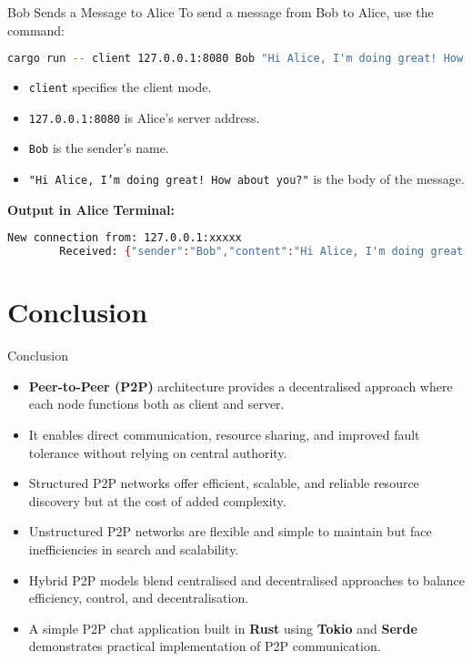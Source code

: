 \documentclass[aspectratio=169, table]{beamer}
\begin{document}
\begin{frame}[fragile]{Bob Sends a Message to Alice}
	\vspace{10pt}
	To send a message from Bob to Alice, use the command:
	\begin{lstlisting}[language=bash]
		cargo run -- client 127.0.0.1:8080 Bob "Hi Alice, I'm doing great! How about you?"
	\end{lstlisting}
	
	\begin{itemize}
		\item \texttt{client} specifies the client mode.
		\item \texttt{127.0.0.1:8080} is Alice's server address.
		\item \texttt{Bob} is the sender's name.
		\item \texttt{"Hi Alice, I'm doing great! How about you?"} is the body of the message.
	\end{itemize}
	
	\textbf{Output in Alice Terminal:}
	\begin{lstlisting}[language=bash]
		New connection from: 127.0.0.1:xxxxx
		Received: {"sender":"Bob","content":"Hi Alice, I'm doing great! How about you?"}
	\end{lstlisting}
\end{frame}

\section{Conclusion}

\begin{frame}{Conclusion}
	\vspace{20pt}
	\begin{itemize}
		\item \textbf{Peer-to-Peer (P2P)} architecture provides a decentralised approach where each node functions both as client and server.
		\item It enables direct communication, resource sharing, and improved fault tolerance without relying on central authority.
		\item Structured P2P networks offer efficient, scalable, and reliable resource discovery but at the cost of added complexity.
		\item Unstructured P2P networks are flexible and simple to maintain but face inefficiencies in search and scalability.
		\item Hybrid P2P models blend centralised and decentralised approaches to balance efficiency, control, and decentralisation.
		\item A simple P2P chat application built in \textbf{Rust} using \textbf{Tokio} and \textbf{Serde} demonstrates practical implementation of P2P communication.
	\end{itemize}
\end{frame}
\end{document}
